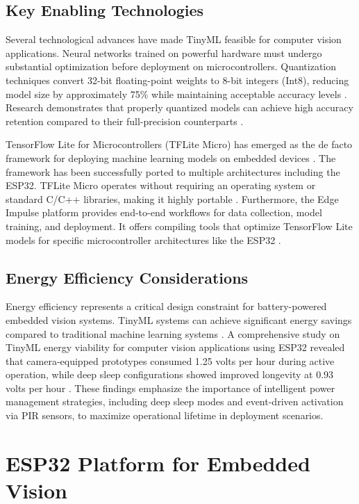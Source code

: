 \documentclass[12pt, a4paper]{article}
\begin{document}
\subsection{Key Enabling Technologies}
Several technological advances have made TinyML feasible for computer vision applications. Neural networks trained on powerful hardware must undergo substantial optimization before deployment on microcontrollers. Quantization techniques convert 32-bit floating-point weights to 8-bit integers (Int8), reducing model size by approximately 75\% while maintaining acceptable accuracy levels \cite{ref9, ref10}. Research demonstrates that properly quantized models can achieve high accuracy retention compared to their full-precision counterparts \cite{ref7, ref11}.

TensorFlow Lite for Microcontrollers (TFLite Micro) has emerged as the de facto framework for deploying machine learning models on embedded devices \cite{ref11}. The framework has been successfully ported to multiple architectures including the ESP32. TFLite Micro operates without requiring an operating system or standard C/C++ libraries, making it highly portable \cite{ref12}. Furthermore, the Edge Impulse platform provides end-to-end workflows for data collection, model training, and deployment. It offers compiling tools that optimize TensorFlow Lite models for specific microcontroller architectures like the ESP32 \cite{ref13, ref14}.

\subsection{Energy Efficiency Considerations}
Energy efficiency represents a critical design constraint for battery-powered embedded vision systems. TinyML systems can achieve significant energy savings compared to traditional machine learning systems \cite{ref6}. A comprehensive study on TinyML energy viability for computer vision applications using ESP32 revealed that camera-equipped prototypes consumed 1.25 volts per hour during active operation, while deep sleep configurations showed improved longevity at 0.93 volts per hour \cite{ref6}. These findings emphasize the importance of intelligent power management strategies, including deep sleep modes and event-driven activation via PIR sensors, to maximize operational lifetime in deployment scenarios.

\section{ESP32 Platform for Embedded Vision}
\end{document}
